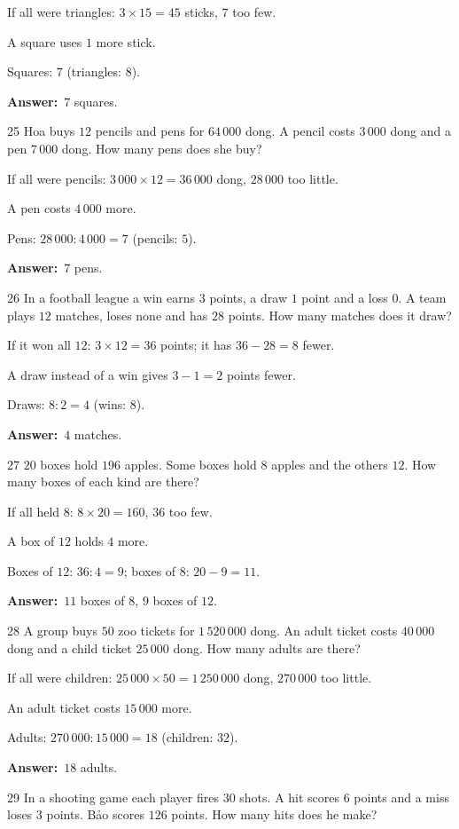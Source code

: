 \documentclass[11pt]{article}
\newif\ifsol \solfalse
\providecommand{\AnsWord}{Đáp số}
\newcommand{\dapso}[1]{\par\textbf{\AnsWord:}\ #1}
\newcommand{\probsol}[1]{%
  \begin{lrbox}{\solmeasure}\begin{minipage}{\dimexpr\linewidth-24pt\relax}#1\end{minipage}\end{lrbox}%
  \ifsol
    \begin{solbox}#1\end{solbox}%
  \else
    \setlength{\solht}{\dimexpr\ht\solmeasure+\dp\solmeasure+0.85cm\relax}%
    \ifdim\solht<1.35cm\setlength{\solht}{1.35cm}\fi
    \begin{tcolorbox}[colback=white,colframe=Line,boxrule=0.8pt,arc=5pt,
      left=8pt,right=8pt,top=4pt,bottom=4pt,height=\solht]{\footnotesize\color{Slate}\itshape\WorkWord}\end{tcolorbox}%
  \fi}
\newcommand{\gap}{\vspace{0.3cm}}
\def\WorkWord{Your work:}
\def\AnsWord{Answer}
\begin{document}
\probsol{
If all were triangles: $3\times15=45$ sticks, $7$ too few.\par
A square uses $1$ more stick.\par Squares: $7$ (triangles: $8$).
\dapso{$7$ squares.}}
\gap
\begin{probbox}{25}{\relax}
Hoa buys $12$ pencils and pens for $64\,000$ dong. A pencil costs $3\,000$ dong and a pen $7\,000$ dong. How many pens does she buy?
\end{probbox}
\probsol{
If all were pencils: $3\,000\times12=36\,000$ dong, $28\,000$ too little.\par
A pen costs $4\,000$ more.\par Pens: $28\,000:4\,000=7$ (pencils: $5$).
\dapso{$7$ pens.}}
\gap
\begin{probbox}{26}{\relax}
In a football league a win earns $3$ points, a draw $1$ point and a loss $0$. A team plays $12$ matches, loses none and has $28$ points. How many matches does it draw?
\end{probbox}
\probsol{
If it won all $12$: $3\times12=36$ points; it has $36-28=8$ fewer.\par
A draw instead of a win gives $3-1=2$ points fewer.\par Draws: $8:2=4$ (wins: $8$).
\dapso{$4$ matches.}}
\gap
\begin{probbox}{27}{\relax}
$20$ boxes hold $196$ apples. Some boxes hold $8$ apples and the others $12$. How many boxes of each kind are there?
\end{probbox}
\probsol{
If all held $8$: $8\times20=160$, $36$ too few.\par
A box of $12$ holds $4$ more.\par Boxes of $12$: $36:4=9$; boxes of $8$: $20-9=11$.
\dapso{$11$ boxes of $8$, $9$ boxes of $12$.}}
\gap
\begin{probbox}{28}{\relax}
A group buys $50$ zoo tickets for $1\,520\,000$ dong. An adult ticket costs $40\,000$ dong and a child ticket $25\,000$ dong. How many adults are there?
\end{probbox}
\probsol{
If all were children: $25\,000\times50=1\,250\,000$ dong, $270\,000$ too little.\par
An adult ticket costs $15\,000$ more.\par Adults: $270\,000:15\,000=18$ (children: $32$).
\dapso{$18$ adults.}}
\gap
\begin{probbox}{29}{\relax}
In a shooting game each player fires $30$ shots. A hit scores $6$ points and a miss loses $3$ points. Bảo scores $126$ points. How many hits does he make?
\end{probbox}
\end{document}
